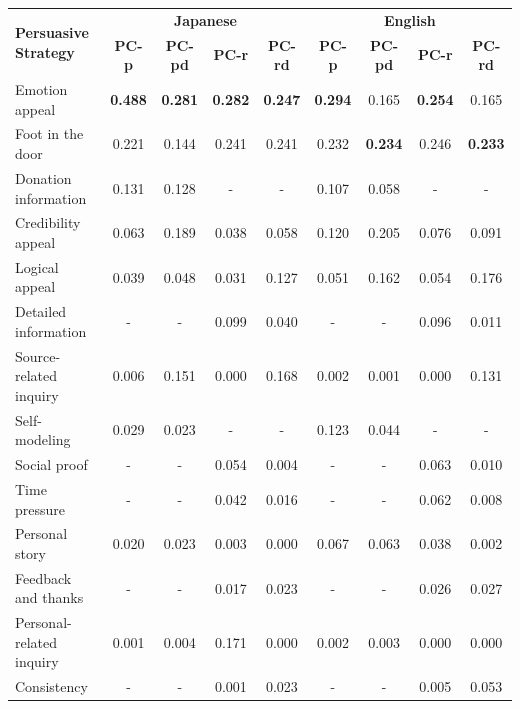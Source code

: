 \begin{table}[t]
    \centering
    \small
    \tabcolsep 3pt
    \begin{tabular}{l|cccc|cccc}
        \toprule
        \multirow{2}{*}{\bf{Persuasive Strategy}} & \multicolumn{4}{c|}{\bf Japanese} & \multicolumn{4}{c}{\bf English} \\ %
        & \bf{PC-p} & \bf{PC-pd} & \bf{PC-r} & \bf{PC-rd} & \bf{PC-p} & \bf{PC-pd} & \bf{PC-r} & \bf{PC-rd} \\
        \midrule
        Emotion appeal & \bf{0.488} & \bf{0.281} & \bf{0.282} & \bf{0.247} & \bf{0.294} & 0.165 & \bf{0.254} & 0.165 \\ %
        Foot in the door & 0.221 & 0.144 & 0.241 & 0.241 & 0.232 & \bf{0.234} & 0.246 & \bf{0.233} \\ %
        Donation information & 0.131 & 0.128 & - & - & 0.107 & 0.058 & - & - \\ %
        Credibility appeal & 0.063 & 0.189 & 0.038 & 0.058 & 0.120 & 0.205 & 0.076 & 0.091 \\ %
        Logical appeal & 0.039 & 0.048 & 0.031 & 0.127 & 0.051 & 0.162 & 0.054 & 0.176 \\ %
        Detailed information & - & - & 0.099 & 0.040 & - & - & 0.096 & 0.011 \\ %
        Source-related inquiry & 0.006 & 0.151 & 0.000 & 0.168 & 0.002 & 0.001 & 0.000 & 0.131 \\ %
        Self-modeling & 0.029 & 0.023 & - & - & 0.123 & 0.044 & - & - \\ %
        Social proof & - & - & 0.054 & 0.004 & - & - & 0.063 & 0.010 \\ %
        Time pressure & - & - & 0.042 & 0.016 & - & - & 0.062 & 0.008 \\ %
        Personal story & 0.020 & 0.023 & 0.003 & 0.000 & 0.067 & 0.063 & 0.038 & 0.002 \\ %
        Feedback and thanks & - & - & 0.017 & 0.023 & - & - & 0.026 & 0.027 \\ %
        Personal-related inquiry & 0.001 & 0.004 & 0.171 & 0.000 & 0.002 & 0.003 & 0.000 & 0.000 \\ %
        Consistency & - & - & 0.001 & 0.023 & - & - & 0.005 & 0.053 \\ %

\end{tabular}
\end{table}
